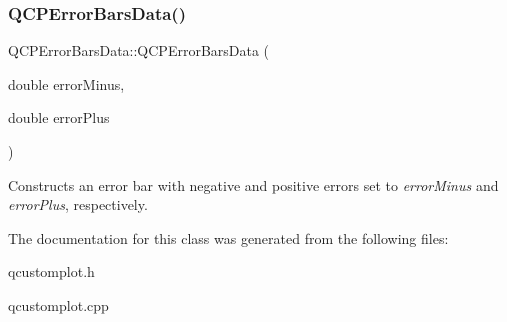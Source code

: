 \subsubsection{\texorpdfstring{Q\+C\+P\+Error\+Bars\+Data()}{QCPErrorBarsData()}\hspace{0.1cm}{\footnotesize\ttfamily [3/3]}}
{\footnotesize\ttfamily Q\+C\+P\+Error\+Bars\+Data\+::\+Q\+C\+P\+Error\+Bars\+Data (\begin{DoxyParamCaption}\item[{double}]{error\+Minus,  }\item[{double}]{error\+Plus }\end{DoxyParamCaption})}

Constructs an error bar with negative and positive errors set to {\itshape error\+Minus} and {\itshape error\+Plus}, respectively. 

The documentation for this class was generated from the following files\+:\begin{DoxyCompactItemize}
\item 
qcustomplot.\+h\item 
qcustomplot.\+cpp\end{DoxyCompactItemize}
